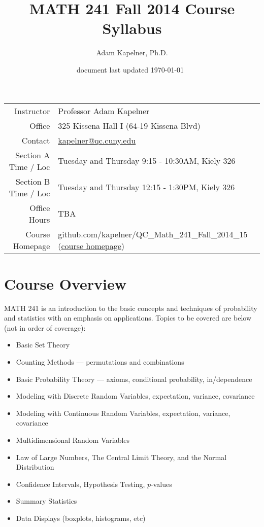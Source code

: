 \documentclass[12pt]{article}
\title{MATH 241 Fall 2014 Course Syllabus}
\author[]{Adam Kapelner, Ph.D.}
\affil[]{Queens College, City University of New York}
\date{\small document last updated \today ~\currenttime }
\newcommand{\coursewebpage}{\href{https://github.com/kapelner/QC_Math_241_Fall_2014_15}{course homepage}}
\begin{document}
\maketitle

\begin{table}[htp]
\centering
\begin{tabular}{rl}
Instructor & Professor Adam Kapelner \\
Office & 325 Kissena Hall I (64-19 Kissena Blvd) \\
Contact & \url{kapelner@qc.cuny.edu} \\
Section A Time / Loc & Tuesday and Thursday 9:15 - 10:30AM, Kiely 326 \\
Section B Time / Loc & Tuesday and Thursday 12:15 - 1:30PM, Kiely 326 \\
Office Hours & TBA \\
Course Homepage & github.com/kapelner/QC\_Math\_241\_Fall\_2014\_15 (\coursewebpage)
\end{tabular}
\end{table}

\section*{Course Overview}

MATH 241 is an introduction to the basic concepts and techniques of probability and statistics with an emphasis on applications. Topics to be covered are below (not in order of coverage):

\begin{itemize}
\itemsep -0.0em 
\item Basic Set Theory
\item Counting Methods --- permutations and combinations
\item Basic Probability Theory --- axioms, conditional probability, in/dependence
\item Modeling with Discrete Random Variables, expectation, variance, covariance
\item Modeling with Continuous Random Variables, expectation, variance, covariance
\item Multidimensional Random Variables
\item Law of Large Numbers, The Central Limit Theory, and the Normal Distribution
\item Confidence Intervals, Hypothesis Testing, $p$-values
\item Summary Statistics
\item Data Displays (boxplots, histograms, etc)
\end{itemize}
\end{document}
